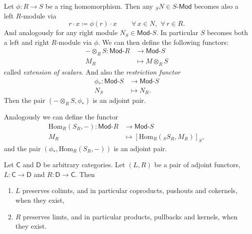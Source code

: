 \begin{ex}
	Let $\phi\colon R \to S$ be a ring homomorphism.
	Then any ${}_SN \in S\text{-}\mathsf{Mod}$ becomes also a left $R$-module via
	\begin{equation}
		r \cdot x \coloneqq \phi(r) \cdot x \qquad \,\forall\, x \in N,\ \,\forall\, r \in R
	.\end{equation} 
	And analogously for any right module $N_S \in \mathsf{Mod}\text{-}S$.
	In particular $S$ becomes both a left and right $R$-module via $\phi$.
	We can then define the following functors:
	\begin{align}
		-\otimes_R S\colon \mathsf{Mod}\text{-}R &\to \mathsf{Mod}\text{-}S \\
		M_R &\mapsto M \otimes_R S
	\end{align} 
	called {\em extension of scalars}.
	And also the {\em restriction functor}
	\begin{align}
		\phi_*\colon \mathsf{Mod}\text{-}S &\to \mathsf{Mod}\text{-}S \\
		N_S &\mapsto N_R
	.\end{align} 
	Then the pair $\left(- \otimes_R S, \phi_*\right)$ is an adjoint pair.

	Analogously we can define the functor
	\begin{align}
		\mathrm{Hom}_{ R}\left( S_R, - \right)\colon \mathsf{Mod}\text{-}R &\to \mathsf{Mod}\text{-}S\\
		M_R &\mapsto \left[ \mathrm{Hom}_{R}\left({}_SS_R, M_R \right) \right]_S
	,\end{align} 
	and the pair $\left(\phi_*, \mathrm{Hom}_{ R}\left( S_R, - \right)\right)$ is an adjoint pair.
\end{ex} 	

\begin{prop}
	Let $\mathsf{C}$ and $\mathsf{D}$ be arbitrary categories.
	Let $\left(L, R\right)$ be a pair of adjoint functors, $L\colon \mathsf{C} \to \mathsf{D}$ and
	$R\colon \mathsf{D} \to \mathsf{C}$.
	Then
	\begin{enumerate}
		\item $L$ preserves colimts, and in particular coproducts, pushouts and cokernels,
			when they exist,
		\item $R$ preserves limts, and in particular products, pullbacks and kernels,
			when they exist.
	\end{enumerate}
\end{prop} 

